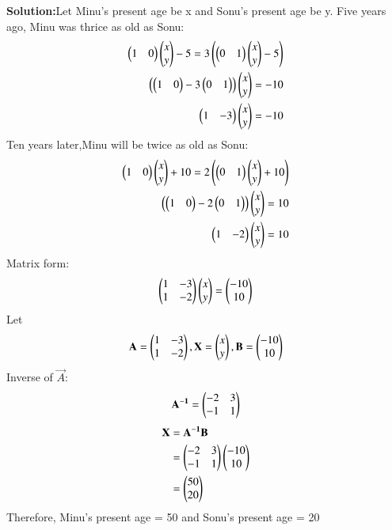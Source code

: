 \documentclass[journal]{IEEEtran}
\begin{document}
\textbf{Solution:}Let Minu's present age be x and Sonu's present age be y.
Five years ago, Minu was thrice as old as Sonu:
\begin{align}
\myvec{1 & 0}\myvec{x \\ y}-5 = 3\brak{\myvec{0 & 1}\myvec{x \\ y}-5} \\
\brak{\myvec{1 & 0}-3\myvec{0 & 1}}\myvec{x \\ y}= -10 \\ 
\myvec{1 & -3}\myvec{x \\ y}= -10 
\end{align}
Ten years later,Minu will be twice as old as Sonu:
\begin{align}
\myvec{1 & 0}\myvec{x \\ y}+10= 2\brak{\myvec{0 & 1}\myvec{x \\ y}+10} \\
\brak{\myvec{1 & 0}-2\myvec{0 & 1}}\myvec{x \\ y}= 10 \\
\myvec{1 & -2}\myvec{x \\ y}= 10 
\end{align}
Matrix form:
\begin{align}
\myvec{1 & -3 \\1 & -2}\myvec{x \\ y}=\myvec{-10 \\ 10}
\end{align}
Let 
\begin{align}
\vec{A} = \myvec{1 & -3\\ 1 & -2},\vec{X} =\myvec{x \\ y},\vec{B} =\myvec{-10 \\ 10}
\end{align}
Inverse of $\vec{A}$:
\begin{align}
\vec{A^{-1}} =\myvec{-2 & 3\\ -1 & 1} 
\end{align}
\begin{align}
\vec{X} &= \vec{A^{-1}}\vec{B} \\
&=\myvec{-2 & 3\\ -1 & 1}\myvec{-10 \\ 10} \\
&=\myvec{50 \\ 20}
\end{align}
Therefore, Minu's present age = 50 and Sonu's present age = 20
\end{document}
